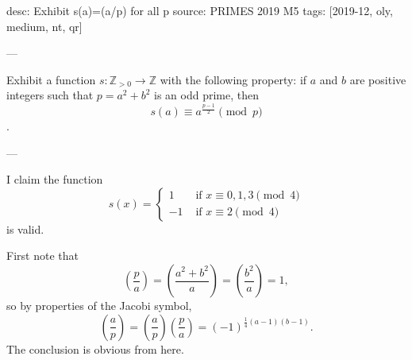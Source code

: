desc: Exhibit s(a)=(a/p) for all p
source: PRIMES 2019 M5
tags: [2019-12, oly, medium, nt, qr]

---

Exhibit a function $s:\mathbb Z_{>0}\to\mathbb Z$ with the following property: if $a$ and $b$ are positive integers such that $p=a^2+b^2$ is an odd prime, then \[s(a)\equiv a^{\frac{p-1}2}\pmod p\].

---

I claim the function \[s(x)=\begin{cases}1&\text{ if }x\equiv0,1,3\pmod4\\ -1&\text{ if }x\equiv2\pmod4\end{cases}\]
is valid.

First note that \[\left(\frac pa\right)=\left(\frac{a^2+b^2}a\right)=\left(\frac{b^2}a\right)=1,\]
so by properties of the Jacobi symbol, \[\left(\frac ap\right)=\left(\frac ap\right)\left(\frac pa\right)=(-1)^{\frac14(a-1)(b-1)}.\]
The conclusion is obvious from here.


